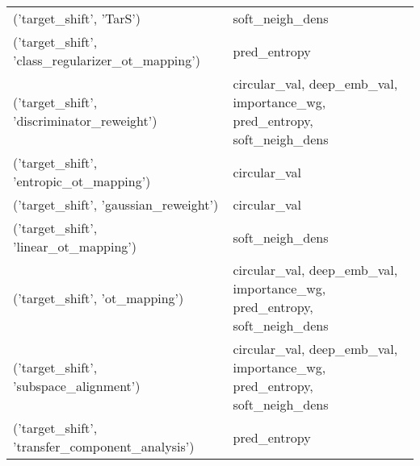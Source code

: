 \begin{tabular}{ll}
 ('target\_shift', 'TarS')                            & soft\_neigh\_dens                                                          \\
 ('target\_shift', 'class\_regularizer\_ot\_mapping')    & pred\_entropy                                                             \\
 ('target\_shift', 'discriminator\_reweight')          & circular\_val, deep\_emb\_val, importance\_wg, pred\_entropy, soft\_neigh\_dens \\
 ('target\_shift', 'entropic\_ot\_mapping')             & circular\_val                                                             \\
 ('target\_shift', 'gaussian\_reweight')               & circular\_val                                                             \\
 ('target\_shift', 'linear\_ot\_mapping')               & soft\_neigh\_dens                                                          \\
 ('target\_shift', 'ot\_mapping')                      & circular\_val, deep\_emb\_val, importance\_wg, pred\_entropy, soft\_neigh\_dens \\
 ('target\_shift', 'subspace\_alignment')              & circular\_val, deep\_emb\_val, importance\_wg, pred\_entropy, soft\_neigh\_dens \\
 ('target\_shift', 'transfer\_component\_analysis')     & pred\_entropy                                                             \\
\hline
\end{tabular}

